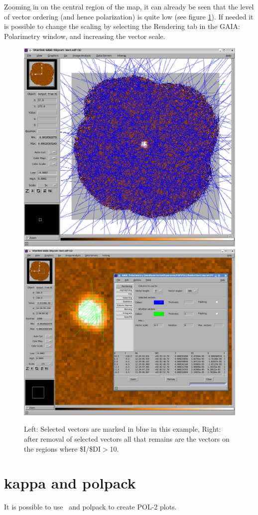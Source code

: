 Zooming in on the central region of the map, it can already be seen that the level of vector ordering
(and hence polarization) is quite low (see figure \ref{fig:gaia-plot-vectors3}). If needed it is
possible to change the scaling by selecting the Rendering tab in the GAIA: Polarimetry
window, and increasing the vector scale.


\begin{figure}[t!]
\begin{center}
\includegraphics[width=0.44\linewidth]{sc22-gaia-plot-vectors-5.png}
\includegraphics[width=0.52\linewidth]{sc22-gaia-plot-vectors-7.png}
\label{fig:gaia-plot-vectors3}
\caption [Over Plotting Vectors in GAIA]{
  \small Left: Selected vectors are marked in blue in this example, Right: after removal of selected
vectors all that remains are the vectors on the regions where \$I/\$DI$>$10.
}
\end{center}
\end{figure}


\section{kappa and polpack}

It is possible to use \Kappa\ and polpack to create POL-2 plots.

\begin{terminalv}
\end{terminalv}

